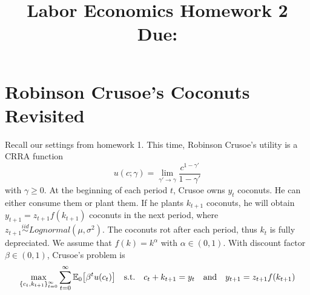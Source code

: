 \documentclass[12pt]{article}
\title{
    Labor Economics Homework 2 \\
    \large Due: \\
    }
\author{}
\date{}
\begin{document}

\maketitle
\vspace{-2cm}

\section{Robinson Crusoe's Coconuts Revisited}
Recall our settings from homework 1. This time, 
Robinson Crusoe's utility is a CRRA function 
\begin{equation*}
    u(c; \gamma) = \lim_{\gamma'\to\gamma}\frac{c^{1-\gamma'}}{1-\gamma'}
\end{equation*}
with $\gamma\geq 0$. At the beginning of each period 
$t$, Crusoe owns $y_t$ coconuts. He 
can either consume them or plant them. If he plants 
$k_{t+1}$ coconuts, he will obtain $y_{t+1} = 
z_{t+1}f(k_{t+1})$ coconuts in the next period, where 
$z_{t+1}\overset{iid}{\sim} Lognormal(\mu,\sigma^2)$. 
The coconuts rot after each period, thus $k_t$ 
is fully depreciated. We assume that $f(k) = 
k^\alpha$ with $\alpha \in (0,1)$. With discount 
factor $\beta\in(0,1)$, Crusoe's problem is 
\begin{equation*}
    \max_{\{c_t,k_{t+1}\}_{t=0}^\infty} \sum_{t=0}^\infty 
    \E_0\sbrc{\beta^t u(c_t)} \quad \text{s.t.} \quad 
    c_t + k_{t+1} = y_t \quad \text{and} \quad y_{t+1} = 
    z_{t+1}f(k_{t+1})
\end{equation*} 
\end{document}
